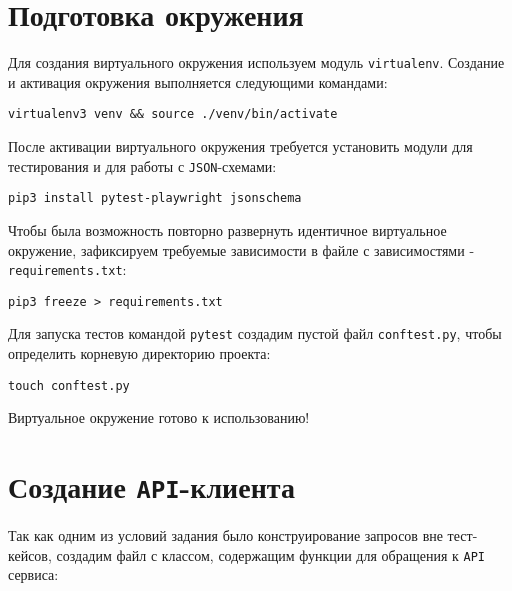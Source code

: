 \section{Подготовка окружения}

Для создания виртуального окружения используем модуль \texttt{virtualenv}. Создание и активация окружения выполняется следующими командами:

\begin{verbatim}
virtualenv3 venv && source ./venv/bin/activate    
\end{verbatim}

После активации виртуального окружения требуется установить модули для тестирования и для работы с \texttt{JSON}-схемами:

\begin{verbatim}
pip3 install pytest-playwright jsonschema
\end{verbatim}

Чтобы была возможность повторно развернуть идентичное виртуальное окружение, зафиксируем требуемые зависимости в файле с зависимостями - \texttt{requirements.txt}:

\begin{verbatim}
pip3 freeze > requirements.txt
\end{verbatim}

Для запуска тестов командой \texttt{pytest} создадим пустой файл \texttt{conftest.py}, чтобы определить корневую директорию проекта:

\begin{verbatim}
touch conftest.py
\end{verbatim}

Виртуальное окружение готово к использованию!

\section{Создание \texttt{API}-клиента}

Так как одним из условий задания было конструирование запросов вне тест-кейсов, создадим файл с классом, содержащим функции для обращения к \texttt{API} сервиса:

